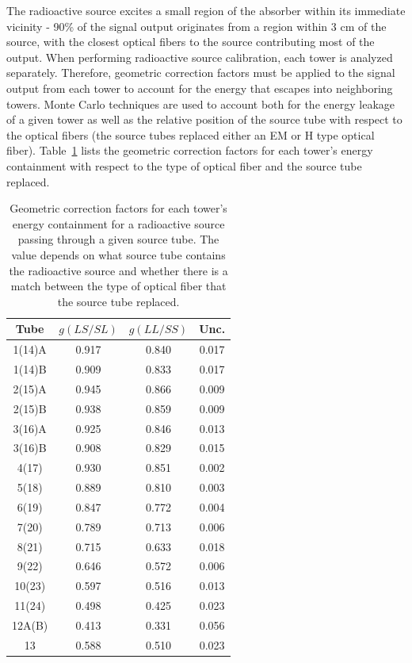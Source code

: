 The radioactive source excites a small region of the absorber within its immediate vicinity - 90\% of the signal output originates from a region within 3 cm of the source, with the closest optical fibers to the source contributing  most of the output. When performing radioactive source calibration, each tower is analyzed separately. Therefore, geometric correction factors must be applied to the signal output from each tower to account for the energy that escapes into neighboring towers. Monte Carlo techniques are used to account both for the energy leakage of a given tower as well as the relative position of the source tube with respect to the optical fibers (the source tubes replaced
either an EM or H type optical fiber). Table~\ref{tab:hf_description_gcfactors} lists the geometric correction factors for each tower's energy containment with respect to the type of optical fiber and the source tube replaced.
\begin{table}[htb]
  \centering
  \caption{Geometric correction factors for each tower's energy containment for a radioactive source
  passing through a given source tube. The value depends on what source tube contains the radioactive
  source and whether there is a match between the type of optical fiber that the source tube replaced.}
  \begin{tabular}{|c|c|c|c|}
  \hline
  Tube & $g(LS/SL)$ & $g(LL/SS)$ & Unc. \\
  \hline
  1(14)A & 0.917 & 0.840 & 0.017 \\
  1(14)B & 0.909 & 0.833 & 0.017 \\
  2(15)A & 0.945 & 0.866 & 0.009 \\
  2(15)B & 0.938 & 0.859 & 0.009 \\
  3(16)A & 0.925 & 0.846 & 0.013 \\
  3(16)B & 0.908 & 0.829 & 0.015 \\
  4(17)  & 0.930 & 0.851 & 0.002 \\
  5(18)  & 0.889 & 0.810 & 0.003 \\
  6(19)  & 0.847 & 0.772 & 0.004 \\
  7(20)  & 0.789 & 0.713 & 0.006 \\
  8(21)  & 0.715 & 0.633 & 0.018 \\
  9(22)  & 0.646 & 0.572 & 0.006 \\
  10(23) & 0.597 & 0.516 & 0.013 \\
  11(24) & 0.498 & 0.425 & 0.023 \\
  12A(B) & 0.413 & 0.331 & 0.056 \\
  13     & 0.588 & 0.510 & 0.023 \\
  \hline
  \end{tabular}
  \label{tab:hf_description_gcfactors}
\end{table}

